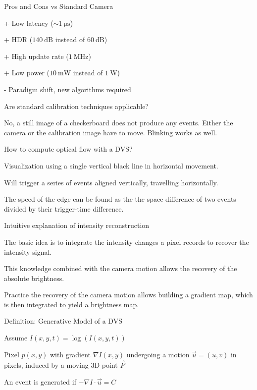 \documentclass[10pt,a4paper]{scrartcl}
\begin{document}
\begin{multicols*}{2}
\begin{QandA}
\end{QandA}

\begin{QandA}
{Pros and Cons vs Standard Camera}
\item[+] Low latency ($\sim\SI{1}{\micro\second}$)
\item[+] HDR ($\SI{140}{\dB}$ instead of $\SI{60}{\dB}$)
\item[+] High update rate ($\SI{1}{\mega\hertz}$)
\item[+] Low power ($\SI{10}{\milli\watt}$ instead of $\SI{1}{\watt}$)
\item[-] Paradigm shift, new algorithms required
\end{QandA}

\begin{QandA}
{Are standard calibration techniques applicable?}
\item No, a still image of a checkerboard does not produce any events. Either the camera or the calibration image have to move. Blinking works as well.
\end{QandA}

\begin{QandA}
{How to compute optical flow with a DVS?}
\item Visualization using a single vertical black line in horizontal movement.
\item Will trigger a series of events aligned vertically, travelling horizontally.
\item The speed of the edge can be found as the the space difference of two events divided by their trigger-time difference. 
\end{QandA}

\begin{QandA}
{Intuitive explanation of intensity reconstruction}
\item The basic idea is to integrate the intensity changes a pixel records to recover the intensity signal.
\item This knowledge combined with the camera motion allows the recovery of the absolute brightness.
\item Practice the recovery of the camera motion allows building a gradient map, which is then integrated to yield a brightness map.
\end{QandA}

\begin{QandA}
{Definition: Generative Model of a DVS}
\item Assume $I(x,y,t)=\log(I(x,y,t))$
\item Pixel $p(x,y)$ with gradient $\nabla I(x,y)$ undergoing a motion $\vec{u}=(u,v)$ in pixels, induced by a moving 3D point $\vec{P}$
\item An event is generated if $-\nabla I\cdot\vec{u}=C$
\end{QandA}


\end{multicols*}
\end{document}
